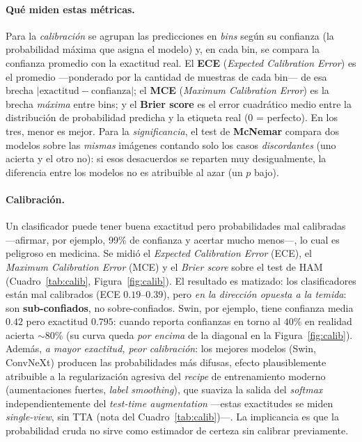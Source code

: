 \documentclass[11pt, a4paper]{article}
\begin{document}
\paragraph{Qué miden estas métricas.} Para la \emph{calibración} se agrupan las predicciones en
\emph{bins} según su confianza (la probabilidad máxima que asigna el modelo) y, en cada bin, se compara
la confianza promedio con la exactitud real. El \textbf{ECE} (\emph{Expected Calibration Error}) es el
promedio —ponderado por la cantidad de muestras de cada bin— de esa brecha $|\text{exactitud}-\text{
confianza}|$; el \textbf{MCE} (\emph{Maximum Calibration Error}) es la brecha \emph{máxima} entre bins; y
el \textbf{Brier score} es el error cuadrático medio entre la distribución de probabilidad predicha y la
etiqueta real (0 = perfecto). En los tres, menor es mejor. Para la \emph{significancia}, el test de
\textbf{McNemar} compara dos modelos sobre las \emph{mismas} imágenes contando solo los casos
\emph{discordantes} (uno acierta y el otro no): si esos desacuerdos se reparten muy desigualmente, la
diferencia entre los modelos no es atribuible al azar (un $p$ bajo).

\paragraph{Calibración.} Un clasificador puede tener buena exactitud pero probabilidades mal calibradas
—afirmar, por ejemplo, 99\% de confianza y acertar mucho menos—, lo cual es peligroso en medicina. Se
midió el \emph{Expected Calibration Error} (ECE), el \emph{Maximum Calibration Error} (MCE) y el
\emph{Brier score} sobre el test de HAM (Cuadro~\ref{tab:calib}, Figura~\ref{fig:calib}). El resultado es
matizado: los clasificadores están mal calibrados (ECE $0.19$--$0.39$), pero \emph{en la dirección
opuesta a la temida}: son \textbf{sub-confiados}, no sobre-confiados. Swin, por ejemplo, tiene confianza
media $0.42$ pero exactitud $0.795$: cuando reporta confianzas en torno al $40\%$ en realidad acierta
$\sim$80\% (su curva queda \emph{por encima} de la diagonal en la Figura~\ref{fig:calib}). Además, \emph{a mayor
exactitud, peor calibración}: los mejores modelos (Swin, ConvNeXt) producen las probabilidades más
difusas, efecto plausiblemente atribuible a la regularización agresiva del \emph{recipe} de entrenamiento
moderno (aumentaciones fuertes, \emph{label smoothing}), que suaviza la salida del \emph{softmax}
independientemente del \emph{test-time augmentation} —estas exactitudes se miden \emph{single-view}, sin
TTA (nota del Cuadro~\ref{tab:calib})—. La implicancia es que la probabilidad cruda no sirve como estimador de certeza sin
calibrar previamente.
\end{document}
